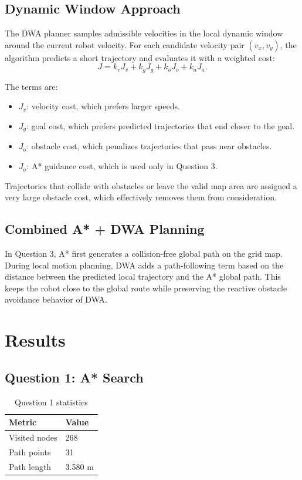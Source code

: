 \documentclass[11pt,a4paper]{article}
\begin{document}
\subsection{Dynamic Window Approach}

The DWA planner samples admissible velocities in the local dynamic window around the current robot velocity. For each candidate velocity pair $(v_x, v_y)$, the algorithm predicts a short trajectory and evaluates it with a weighted cost:
\[
J = k_v J_v + k_g J_g + k_o J_o + k_a J_a.
\]

The terms are:

\begin{itemize}
    \item $J_v$: velocity cost, which prefers larger speeds.
    \item $J_g$: goal cost, which prefers predicted trajectories that end closer to the goal.
    \item $J_o$: obstacle cost, which penalizes trajectories that pass near obstacles.
    \item $J_a$: A* guidance cost, which is used only in Question 3.
\end{itemize}

Trajectories that collide with obstacles or leave the valid map area are assigned a very large obstacle cost, which effectively removes them from consideration.

\subsection{Combined A* + DWA Planning}

In Question 3, A* first generates a collision-free global path on the grid map. During local motion planning, DWA adds a path-following term based on the distance between the predicted local trajectory and the A* global path. This keeps the robot close to the global route while preserving the reactive obstacle avoidance behavior of DWA.

\section{Results}

\subsection{Question 1: A* Search}

\begin{table}[H]
\centering
\begin{tabular}{@{}ll@{}}
\toprule
Metric & Value \\
\midrule
Visited nodes & 268 \\
Path points & 31 \\
Path length & 3.580 m \\
\bottomrule
\end{tabular}
\caption{Question 1 statistics}
\end{table}
\end{document}

